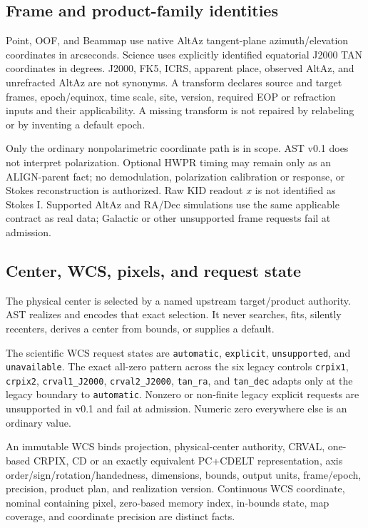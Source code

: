\subsection{Frame and product-family identities}

Point, OOF, and Beammap use native AltAz tangent-plane azimuth/elevation
coordinates in arcseconds.  Science uses explicitly identified equatorial
J2000 TAN coordinates in degrees.  J2000, FK5, ICRS, apparent place, observed
AltAz, and unrefracted AltAz are not synonyms.  A transform declares source
and target frames, epoch/equinox, time scale, site, version, required EOP or
refraction inputs and their applicability.  A missing transform is not
repaired by relabeling or by inventing a default epoch.

Only the ordinary nonpolarimetric coordinate path is in scope. AST v0.1 does
not interpret polarization. Optional HWPR timing may remain only as an
ALIGN-parent fact; no demodulation, polarization calibration or response, or
Stokes reconstruction is authorized. Raw KID readout $x$ is not identified as
Stokes I. Supported AltAz and RA/Dec simulations use the same applicable
contract as real data; Galactic or other unsupported frame requests fail at
admission.

\subsection{Center, WCS, pixels, and request state}

The physical center is selected by a named upstream target/product authority.
AST realizes and encodes that exact selection.  It never searches, fits,
silently recenters, derives a center from bounds, or supplies a default.

The scientific WCS request states are \texttt{automatic},
\texttt{explicit}, \texttt{unsupported}, and \texttt{unavailable}.  The exact
all-zero pattern across the six legacy controls \texttt{crpix1},
\texttt{crpix2}, \texttt{crval1\_J2000}, \texttt{crval2\_J2000},
\texttt{tan\_ra}, and \texttt{tan\_dec} adapts only at the legacy boundary to
\texttt{automatic}.  Nonzero or non-finite legacy explicit requests are
unsupported in v0.1 and fail at admission.  Numeric zero everywhere else is
an ordinary value.

An immutable WCS binds projection, physical-center authority, CRVAL,
one-based CRPIX, CD or an exactly equivalent PC+CDELT representation, axis
order/sign/rotation/handedness, dimensions, bounds, output units, frame/epoch,
precision, product plan, and realization version.  Continuous WCS coordinate,
nominal containing pixel, zero-based memory index, in-bounds state, map
coverage, and coordinate precision are distinct facts.

